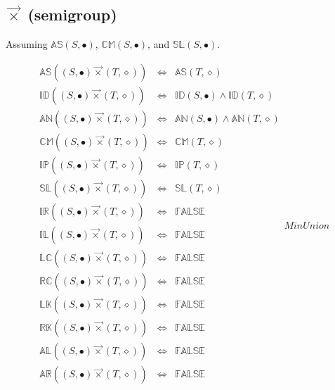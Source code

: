 \documentclass[10pt]{article}
\newcommand{\propname}[1]{{\mathbb{#1}}}
\begin{document}
\subsection{$\vec{\times}$ (semigroup)} 

Assuming 
$\propname{AS}(S, \bullet)$, 
$\propname{CM}(S, \bullet)$,  and 
$\propname{SL}(S, \bullet)$. 

\[
\begin{array}{rcl} 
\propname{AS}((S, \bullet) \vec{\times} (T, \diamond)) 
   & \Leftrightarrow %
   & \propname{AS}(T, \diamond) \\ 
\propname{ID}((S, \bullet) \vec{\times} (T, \diamond)) 
   & \Leftrightarrow %
   & \propname{ID}(S, \bullet) \wedge  \propname{ID}(T, \diamond) \\ 
\propname{AN}((S, \bullet) \vec{\times} (T, \diamond)) 
   & \Leftrightarrow %
   & \propname{AN}(S, \bullet) \wedge  \propname{AN}(T, \diamond) \\ 
\propname{CM}((S, \bullet) \vec{\times} (T, \diamond)) 
   & \Leftrightarrow %
   & \propname{CM}(T, \diamond) \\ 
\propname{IP}((S, \bullet) \vec{\times} (T, \diamond)) 
   & \Leftrightarrow %
   & \propname{IP}(T, \diamond) \\ 
\propname{SL}((S, \bullet) \vec{\times}  (T, \diamond)) 
   & \Leftrightarrow %
   & \propname{SL}(T, \diamond) \\ 
\propname{IR}((S, \bullet) \vec{\times}  (T, \diamond)) 
   & \Leftrightarrow %
   & \propname{FALSE} \\
\propname{IL}((S, \bullet) \vec{\times}  (T, \diamond)) 
   & \Leftrightarrow %
   & \propname{FALSE} \\
\propname{LC}((S, \bullet) \vec{\times} (T, \diamond)) 
   & \Leftrightarrow %
   & \propname{FALSE} \\
\propname{RC}((S, \bullet) \vec{\times} (T, \diamond)) 
   & \Leftrightarrow %
   & \propname{FALSE} \\
\propname{LK}((S, \bullet) \vec{\times} (T, \diamond)) 
   & \Leftrightarrow %
   & \propname{FALSE} \\
\propname{RK}((S, \bullet) \vec{\times} (T, \diamond)) 
   & \Leftrightarrow %
   & \propname{FALSE} \\
\propname{AL}((S, \bullet) \vec{\times}  (T, \diamond))  
   & \Leftrightarrow %
   & \propname{FALSE} \\
\propname{AR}((S, \bullet) \vec{\times}  (T, \diamond))  
   & \Leftrightarrow %
   & \propname{FALSE} \\
\end{array} MinUnion
\] 
\end{document}
